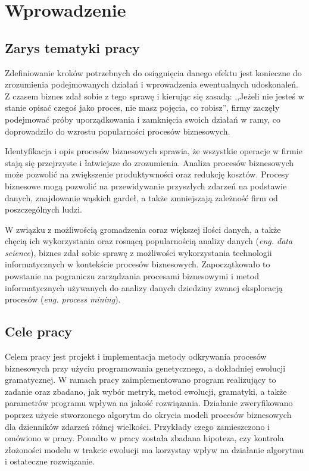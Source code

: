\chapter{Wprowadzenie}
\label{cha:wprowadzenie}


\section{Zarys tematyki pracy}
\label{sec:zarysPracy}

Zdefiniowanie kroków potrzebnych do osiągnięcia danego efektu jest konieczne do zrozumienia podejmowanych działań i wprowadzenia ewentualnych udoskonaleń. Z czasem biznes zdał sobie z tego sprawę i kierując się zasadą: ,,Jeżeli nie jesteś w stanie opisać czegoś jako proces, nie masz pojęcia, co robisz'', firmy zaczęły podejmować próby uporządkowania i zamknięcia swoich działań w ramy, co doprowadziło do wzrostu popularności procesów biznesowych.

Identyfikacja i opis procesów biznesowych sprawia, że wszystkie operacje w firmie stają się przejrzyste i łatwiejsze do zrozumienia. Analiza procesów biznesowych może pozwolić na zwiększenie produktywności oraz redukcję kosztów. Procesy biznesowe mogą pozwolić na przewidywanie przyszłych zdarzeń na podstawie danych, znajdowanie wąskich gardeł, a także zmniejszają zależność firm od poszczególnych ludzi.

W związku z możliwością gromadzenia coraz większej ilości danych, a także chęcią ich wykorzystania oraz rosnącą popularnością analizy danych (\textit{eng. data science}), biznes zdał sobie sprawę z możliwości wykorzystania technologii informatycznych w kontekście procesów biznesowych. Zapoczątkowało to powstanie na pograniczu zarządzania procesami biznesowymi i metod informatycznych używanych do analizy danych dziedziny zwanej eksploracją procesów (\textit{eng. process mining}).
 
\section{Cele pracy}
\label{sec:celePracy}

Celem pracy jest projekt i implementacja metody odkrywania procesów biznesowych przy użyciu programowania genetycznego, a dokładniej ewolucji gramatycznej. W ramach pracy zaimplementowano program realizujący to zadanie oraz zbadano, jak wybór metryk, metod ewolucji, gramatyki, a także parametrów programu wpływa na jakość rozwiązania. Działanie zweryfikowano poprzez użycie stworzonego algorytm do okrycia modeli procesów biznesowych dla dzienników zdarzeń różnej wielkości. Przykłady czego zamieszczono i omówiono w pracy. Ponadto w pracy została zbadana hipoteza, czy kontrola złożoności modelu w trakcie ewolucji ma korzystny wpływ na działanie algorytmu i ostateczne rozwiązanie.


